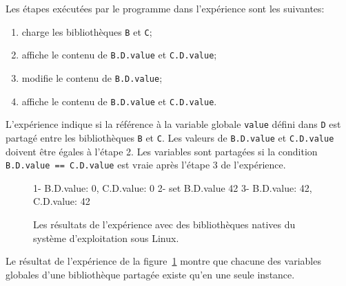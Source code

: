 Les étapes exécutées par le programme dans l'expérience sont les suivantes:
\begin{enumerate}
  \item charge les bibliothèques \texttt{B} et \texttt{C};
  \item affiche le contenu de \texttt{B.D.value} et \texttt{C.D.value};
  \item modifie le contenu de \texttt{B.D.value};
  \item affiche le contenu de \texttt{B.D.value} et \texttt{C.D.value}.
\end{enumerate}
L'expérience indique si la référence à la variable globale \texttt{value} défini
dans \texttt{D} est partagé entre les bibliothèques \texttt{B} et \texttt{C}.
Les valeurs de \texttt{B.D.value} et \texttt{C.D.value} doivent être égales à l'étape 2.
Les variables sont partagées si la condition \verb+B.D.value == C.D.value+ est vraie après
l'étape 3 de l'expérience.\\
\begin{figure}[ht]
  \centering
  \lstset{frame=single}
  \begin{mplisting}{0.5}
1- B.D.value: 0,  C.D.value: 0
2- set B.D.value 42
3- B.D.value: 42,  C.D.value: 42
\end{mplisting}
  \caption{Les résultats de l'expérience avec des bibliothèques natives du système d'exploitation sous Linux.}
  \label{fig:result_global_var_experiment}
\end{figure}

Le résultat de l'expérience de la figure~\ref{fig:result_global_var_experiment} montre
que chacune des variables globales d'une bibliothèque partagée existe qu'en une seule
instance.





